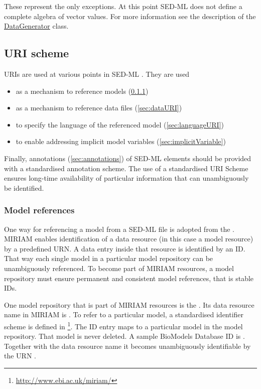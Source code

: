 These represent the only exceptions. At this point SED-ML \currentLV does not define a complete algebra of vector values. For more information see the description of the \hyperref[class:dataGenerator]{DataGenerator} class.
  
  
\subsection{URI scheme}  
\label{sec:uriScheme}

URIs are used at various points in SED-ML \currentLV. They are used 
\begin{itemize}
	\item as a mechanism to reference models (\ref{sec:modelURI})
	\item as a mechanism to reference data files (\ref{sec:dataURI})
	\item to specify the language of the referenced model (\ref{sec:languageURI})
	\item to enable addressing implicit model variables (\ref{sec:implicitVariable})
\end{itemize}

Finally, annotations (\ref{sec:annotations}) of SED-ML elements should be provided with a standardised annotation scheme. The use of a standardised URI Scheme ensures long-time availability of particular information that can unambiguously be identified. 


\subsubsection{Model references}
\label{sec:modelURI}
One way for referencing a model from a SED-ML file is adopted from the . MIRIAM enables identification of a data resource (in this case a model resource) by a predefined URN. A data entry inside that resource is identified by an ID. That way each single  model  in a particular model repository can be unambiguously referenced. To become part of MIRIAM resources, a model repository must ensure permanent and consistent model references, that is stable IDs.

One model repository that is part of MIRIAM resources is the  \citep{LDR+10}. Its data resource name in MIRIAM is . To refer to a particular model, a standardised identifier scheme is defined in \footnote{\url{http://www.ebi.ac.uk/miriam/}}. The ID entry maps to a particular model in the model repository. That model is never deleted. A sample BioModels Database ID is . Together with the data resource name it becomes unambiguously identifiable by the URN . 

